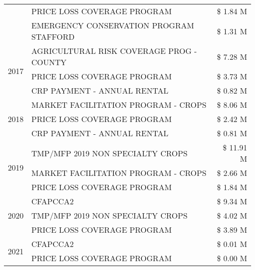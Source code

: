 \begin{tabular}{llr}
 & PRICE LOSS COVERAGE PROGRAM & \$ 1.84 M \\
 & EMERGENCY CONSERVATION PROGRAM STAFFORD & \$ 1.31 M \\
\cline{1-3}
\multirow[t]{3}{*}{2017} & AGRICULTURAL RISK COVERAGE PROG - COUNTY & \$ 7.28 M \\
 & PRICE LOSS COVERAGE PROGRAM & \$ 3.73 M \\
 & CRP PAYMENT - ANNUAL RENTAL & \$ 0.82 M \\
\cline{1-3}
\multirow[t]{3}{*}{2018} & MARKET FACILITATION PROGRAM - CROPS & \$ 8.06 M \\
 & PRICE LOSS COVERAGE PROGRAM & \$ 2.42 M \\
 & CRP PAYMENT - ANNUAL RENTAL & \$ 0.81 M \\
\cline{1-3}
\multirow[t]{3}{*}{2019} & TMP/MFP 2019 NON SPECIALTY CROPS & \$ 11.91 M \\
 & MARKET FACILITATION PROGRAM - CROPS & \$ 2.66 M \\
 & PRICE LOSS COVERAGE PROGRAM & \$ 1.84 M \\
\cline{1-3}
\multirow[t]{3}{*}{2020} & CFAPCCA2 & \$ 9.34 M \\
 & TMP/MFP 2019 NON SPECIALTY CROPS & \$ 4.02 M \\
 & PRICE LOSS COVERAGE PROGRAM & \$ 3.89 M \\
\cline{1-3}
\multirow[t]{2}{*}{2021} & CFAPCCA2 & \$ 0.01 M \\
 & PRICE LOSS COVERAGE PROGRAM & \$ 0.00 M \\
\cline{1-3}
\bottomrule
\end{tabular}
